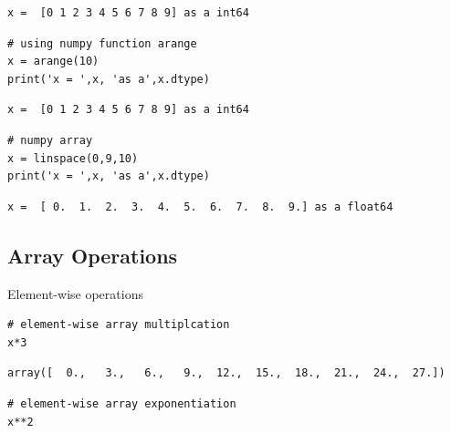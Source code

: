 \documentclass[%
oneside,                 %
final,                   %
10pt]{article}
\begin{document}
\begin{verbatim}
x =  [0 1 2 3 4 5 6 7 8 9] as a int64
\end{verbatim}

\begin{verbatim}
# using numpy function arange
x = arange(10)
print('x = ',x, 'as a',x.dtype)
\end{verbatim}

\begin{verbatim}
x =  [0 1 2 3 4 5 6 7 8 9] as a int64
\end{verbatim}

\begin{verbatim}
# numpy array
x = linspace(0,9,10)
print('x = ',x, 'as a',x.dtype)
\end{verbatim}

\begin{verbatim}
x =  [ 0.  1.  2.  3.  4.  5.  6.  7.  8.  9.] as a float64
\end{verbatim}

\subsection{Array Operations}

Element-wise operations
\begin{verbatim}
# element-wise array multiplcation
x*3
\end{verbatim}


\begin{verbatim}
array([  0.,   3.,   6.,   9.,  12.,  15.,  18.,  21.,  24.,  27.])
\end{verbatim}


\begin{verbatim}
# element-wise array exponentiation
x**2
\end{verbatim}
\end{document}

